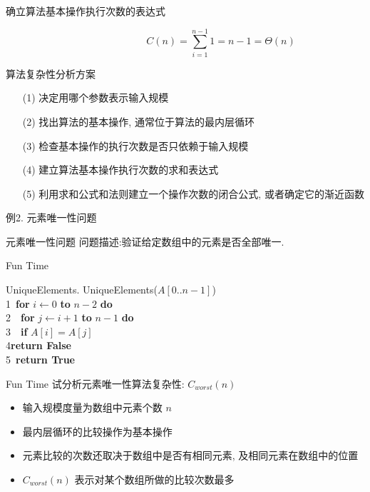 \documentclass[fontset=fandol,UTF8,12pt,aspectratio=169,fleqn]{beamer}
\begin{document}
\begin{frame}{确立算法基本操作执行次数的表达式}
  \begin{exampleblock}{}
    \begin{equation*}
  \hspace{3cm}      C(n) = \sum_{i=1}^{n-1}1 = n - 1 = \Theta(n)
      \end{equation*}
    \end{exampleblock}
  
\end{frame}

\begin{frame}{算法复杂性分析方案}
\begin{itemize}[<+-|alert@+>]
\item[(1)] 决定用哪个参数表示输入规模  
\item[(2)] 找出算法的基本操作, 通常位于算法的最内层循环  
\item[(3)] 检查基本操作的执行次数是否只依赖于输入规模  
\item[(4)] 建立算法基本操作执行次数的求和表达式   
\item[(5)] 利用求和公式和法则建立一个操作次数的闭合公式, 或者确定它的渐近函数  
\end{itemize}
\end{frame}

\begin{frame}{例2. 元素唯一性问题}
  \begin{exampleblock}{元素唯一性问题}
    问题描述:验证给定数组中的元素是否全部唯一.
  \end{exampleblock}
\end{frame}

\begin{frame}{Fun Time}
  \begin{exampleblock}{UniqueElements.}
 UniqueElements($A[0..n-1]$)\\
1\qquad\ \textbf{for} $i\gets 0$ \textbf{to} $n-2$ \textbf{do}\\
2\qquad\ \qquad\ \textbf{for} $j\gets i+1$ \textbf{to} $n-1$ \textbf{do}\\
3\qquad\ \qquad\ \qquad \textbf{if} $A[i]=A[j]$ \\
4\qquad \qquad \qquad \qquad \textbf{return False}\\
5\qquad\ \textbf{return True} 
\end{exampleblock}
\end{frame}

\begin{frame}{Fun Time}
试分析元素唯一性算法复杂性: $C_{worst}(n)$ 
\begin{itemize}[<+-|alert@+>]
\item 输入规模度量为数组中元素个数 $n$  
\item 最内层循环的比较操作为基本操作  
\item 元素比较的次数还取决于数组中是否有相同元素, 及相同元素在数组中的位置 
\item $C_{worst}(n)$ 表示对某个数组所做的比较次数最多  
\end{itemize}
\end{frame}
\end{document}
